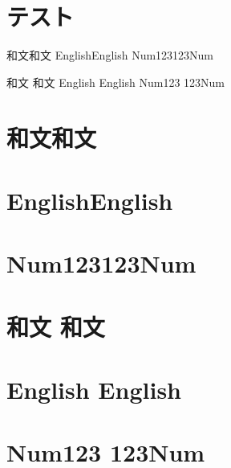 \documentclass{jarticle}
\begin{document}
\tableofcontents
\section{テスト}
和文和文
EnglishEnglish
Num123123Num\par
和文  和文
English  English
Num123  123Num
\section{和文和文}
\section{EnglishEnglish}
\section{Num123123Num}
\section{和文  和文}
\section{English  English}
\section{Num123  123Num}
\end{document}
